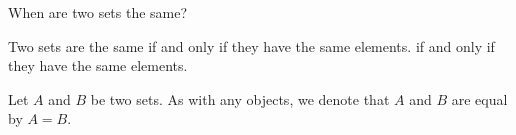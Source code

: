 
\sbasic




\sstart
{}


When are two
sets the same?


Two sets are
the same if and only
if they have the same
elements.
if and only if
they have the same
elements.


Let $A$ and $B$ be
two sets.
As with any objects,
we denote that
$A$ and $B$
are equal
by $A = B$.
\strats

